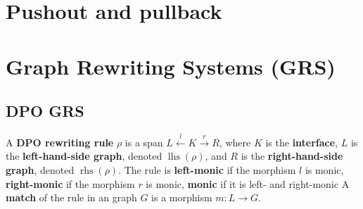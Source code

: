     \section{Pushout and pullback}
        \label{sec:category_theory}
        
    
    \section{Graph Rewriting Systems (GRS)} 
    
    \subsection{DPO GRS}
    \begin{definition}
        \label{def:grs:dpo_rule}
      A \textbf{DPO rewriting rule} $\rho$ is a span \( L \overset{l}{\leftarrow} K \overset{r}{\rightarrow} R \), where \( K \) is the \textbf{interface}, \( L \) is the \textbf{left-hand-side graph}, denoted \( \operatorname{lhs}(\rho) \), and \( R \) is the \textbf{right-hand-side graph}, denoted \( \operatorname{rhs}(\rho) \). The rule is \textbf{left-monic} if the morphism \( l \) is monic, \textbf{right-monic} if the morphism \( r \) is monic, \textbf{monic} if it is left- and right-monic   
      A \textbf{match} of the rule in an graph \( G \) is a morphism \( m: L \mathop{\rightarrow} G \).   
      \end{definition}
    

